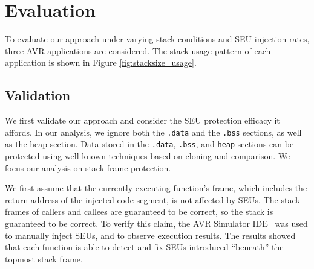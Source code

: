 \vspace{-15pt}
\section{Evaluation}\label{sec:evaluation}
\vspace{-10pt}

To evaluate our approach under varying stack conditions and SEU injection rates, three AVR applications are considered. The stack usage pattern of each application is shown in Figure \ref{fig:stacksize_usage}.
\vspace{-15pt}
\subsection{Validation}
\vspace{-5pt}
We first validate our approach and consider the SEU protection efficacy it affords. In our analysis, we ignore both the \texttt{.data} and the \texttt{.bss} sections, as well as the heap section. Data stored in the \texttt{.data}, \texttt{.bss}, and \texttt{heap} sections can be protected using well-known techniques based on cloning and comparison. We focus our analysis on stack frame protection.

We first assume that the currently executing function's frame, which includes the return address of the injected code segment, is not affected by SEUs. The stack frames of callers and callees are guaranteed to be correct, so the stack is guaranteed to be correct. To verify this claim, the AVR Simulator IDE~\cite{avrsimide} was used to manually inject SEUs, and to observe execution results. The results showed that each function is able to detect and fix SEUs introduced ``beneath'' the topmost stack frame.

